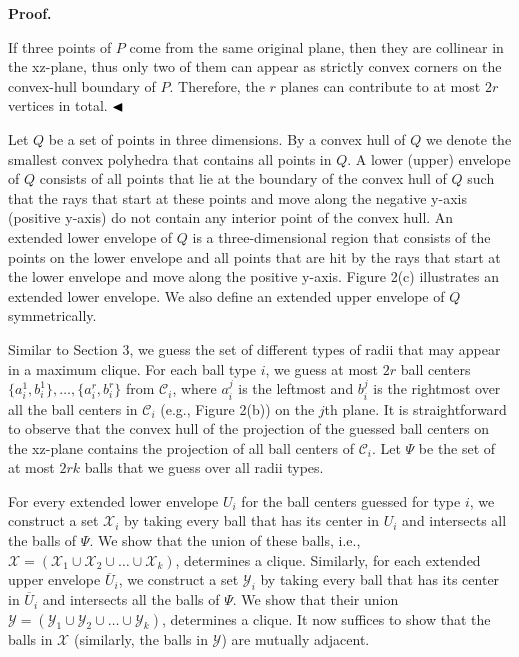 \par
\par
\par
\par\medskip\noindent\textbf{Proof.}\par
If three points of $P$ come from the same original plane, then they are collinear in the xz-plane, thus only two of them can appear as strictly convex corners on the convex-hull boundary of $P$. Therefore, the $r$ planes can contribute to at most $2r$ vertices in total. $\hfill\blacktriangleleft$
\par
\par
Let $Q$ be a set of points in three dimensions. By a convex hull of $Q$ we denote the smallest convex polyhedra that contains all points in $Q$. A lower (upper) envelope of $Q$ consists of all points that lie at the boundary of the convex hull of $Q$ such that the rays that start at these points and move along the negative y-axis (positive y-axis) do not contain any interior point of the convex hull. An extended lower envelope of $Q$ is a three-dimensional region that consists of the points on the lower envelope and all points that are hit by the rays that start at the lower envelope and move along the positive y-axis. Figure 2(c) illustrates an extended lower envelope. We also define an extended upper envelope of $Q$ symmetrically.
\par
\par
Similar to Section 3, we guess the set of different types of radii that may appear in a maximum clique. For each ball type $i$, we guess at most $2r$ ball centers $\{a^{1}_{i},b^{1}_{i}\},\ldots,\{a^{r}_{i},b^{r}_{i}\}$ from $\mathcal{C}_{i}$, where $a^{j}_{i}$ is the leftmost and $b^{j}_{i}$ is the rightmost over all the ball centers in $\mathcal{C}_{i}$ (e.g., Figure 2(b)) on the $j$th plane. It is straightforward to observe that the convex hull of the projection of the guessed ball centers on the xz-plane contains the projection of all ball centers of $\mathcal{C}_{i}$. Let $\Psi$ be the set of at most $2rk$ balls that we guess over all radii types.
\par
\par
For every extended lower envelope $U_{i}$ for the ball centers guessed for type $i$, we construct a set $\mathcal{X}_{i}$ by taking every ball that has its center in $U_{i}$ and intersects all the balls of $\Psi$. We show that the union of these balls, i.e., $\mathcal{X}=(\mathcal{X}_{1}\cup\mathcal{X}_{2}\cup\ldots\cup\mathcal{X}_{k})$, determines a clique. Similarly, for each extended upper envelope $\overline{U}_{i}$, we construct a set $\mathcal{Y}_{i}$ by taking every ball that has its center in $\overline{U}_{i}$ and intersects all the balls of $\Psi$. We show that their union $\mathcal{Y}=(\mathcal{Y}_{1}\cup\mathcal{Y}_{2}\cup\ldots\cup\mathcal{Y}_{k})$, determines a clique. It now suffices to show that the balls in $\mathcal{X}$ (similarly, the balls in $\mathcal{Y}$) are mutually adjacent.
